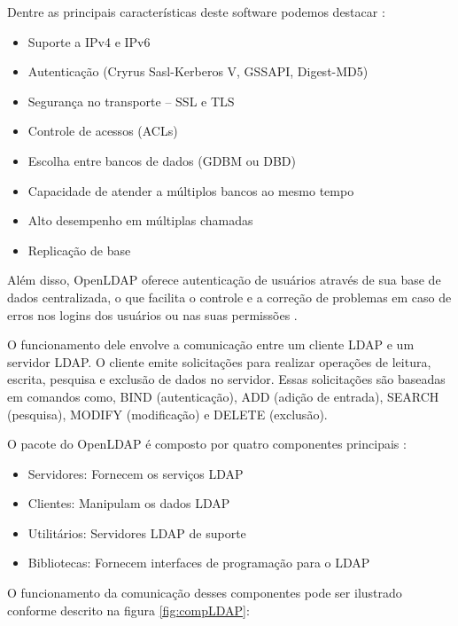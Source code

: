 Dentre as principais características deste software podemos destacar \cite{universidade-fumec}:

\begin{itemize}
    \item Suporte a IPv4 e IPv6
    \item Autenticação (Cryrus Sasl-Kerberos V, GSSAPI, Digest-MD5)
    \item Segurança no transporte – SSL e TLS
    \item Controle de acessos (ACLs)
    \item Escolha entre bancos de dados (GDBM ou DBD)
    \item Capacidade de atender a múltiplos bancos ao mesmo tempo
    \item Alto desempenho em múltiplas chamadas
    \item Replicação de base
\end{itemize}

Além disso, OpenLDAP oferece autenticação de usuários através de sua base de dados centralizada, o que facilita o controle e a correção de problemas em caso de erros nos logins dos usuários ou nas suas permissões \cite{ninjadolinux}.

O funcionamento dele envolve a comunicação entre um cliente LDAP e um servidor LDAP. O cliente emite solicitações para realizar operações de leitura, escrita, pesquisa e exclusão de dados no servidor. Essas solicitações são baseadas em comandos como, BIND (autenticação), ADD (adição de entrada), SEARCH (pesquisa), MODIFY (modificação) e DELETE (exclusão).

O pacote do OpenLDAP é composto por quatro componentes principais \cite{lima2021estudo}:

\begin{itemize}
    \item Servidores: Fornecem os serviços LDAP
    \item Clientes: Manipulam os dados LDAP
    \item Utilitários: Servidores LDAP de suporte
    \item Bibliotecas: Fornecem interfaces de programação para o LDAP
\end{itemize}

O funcionamento da comunicação desses componentes pode ser ilustrado conforme descrito na figura \ref{fig:compLDAP}:

